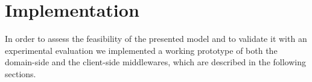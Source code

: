 \section{Implementation}\label{sec:implementation}

In order to assess the feasibility of the presented model and to validate it with an experimental evaluation we implemented a working prototype of both the domain-side and the client-side middlewares, which are described in the following sections.



